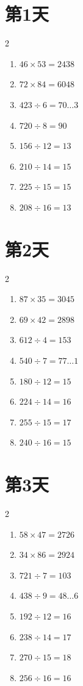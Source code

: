 \documentclass[12pt]{ctexart}
\begin{document}
	
	\section*{第1天}
	\begin{multicols}{2}
		\begin{enumerate}[itemsep=0pt]
			\item $46 \times 53 = 2438$
			\item $72 \times 84 = 6048$
			\item $423 \div 6 = 70\ldots 3$
			\item $720 \div 8 = 90$
			\item $156 \div 12 = 13$
			\item $210 \div 14 = 15$
			\item $225 \div 15 = 15$
			\item $208 \div 16 = 13$
		\end{enumerate}
	\end{multicols}
	
	\section*{第2天}
	\begin{multicols}{2}
		\begin{enumerate}[itemsep=0pt]
			\item $87 \times 35 = 3045$
			\item $69 \times 42 = 2898$
			\item $612 \div 4 = 153$
			\item $540 \div 7 = 77\ldots 1$
			\item $180 \div 12 = 15$
			\item $224 \div 14 = 16$
			\item $255 \div 15 = 17$
			\item $240 \div 16 = 15$
		\end{enumerate}
	\end{multicols}
	
	\section*{第3天}
	\begin{multicols}{2}
		\begin{enumerate}[itemsep=0pt]
			\item $58 \times 47 = 2726$
			\item $34 \times 86 = 2924$
			\item $721 \div 7 = 103$
			\item $438 \div 9 = 48\ldots 6$
			\item $192 \div 12 = 16$
			\item $238 \div 14 = 17$
			\item $270 \div 15 = 18$
			\item $256 \div 16 = 16$
		\end{enumerate}
	\end{multicols}
	
\end{document}
